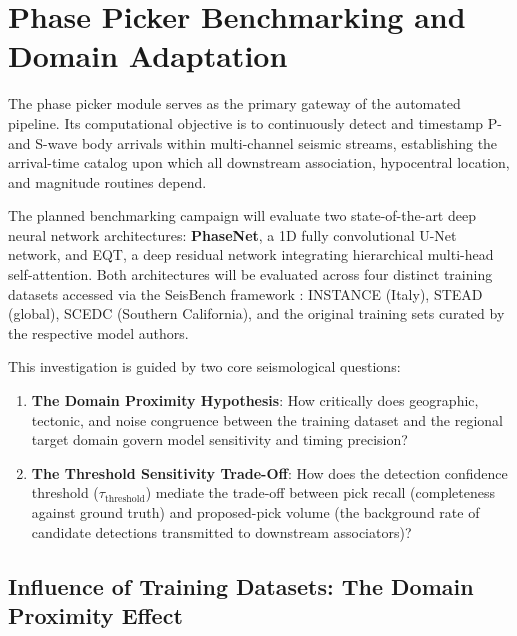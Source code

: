 \section{Phase Picker Benchmarking and Domain Adaptation}
\label{sec:picker_benchmarking}

The phase picker module serves as the primary gateway of the
automated pipeline. Its computational objective is to continuously
detect and timestamp P- and S-wave body arrivals within
multi-channel seismic streams, establishing the arrival-time catalog
upon which all downstream association, hypocentral location, and
magnitude routines depend.

The planned benchmarking campaign will evaluate two
state-of-the-art deep neural network architectures:
\textbf{\ac{PhaseNet}}, a 1D fully convolutional U-Net
network, and \acf{EQT}, a deep residual network integrating
hierarchical multi-head self-attention. Both architectures will be
evaluated across four distinct training datasets accessed via the
SeisBench framework \parencite{SeisBench}: \ac{INSTANCE} (Italy),
\ac{STEAD} (global), \ac{SCEDC} (Southern California), and the
original training sets curated by the respective model authors.

This investigation is guided by two core seismological questions:
\begin{enumerate}
  \item \textbf{The Domain Proximity Hypothesis}: How critically
    does geographic, tectonic, and noise congruence between the
    training dataset and the regional target domain govern model
    sensitivity and timing precision?
  \item \textbf{The Threshold Sensitivity Trade-Off}: How does the
    detection confidence threshold ($\tau_{\mathrm{threshold}}$)
    mediate the trade-off between pick recall (completeness against
    ground truth) and proposed-pick volume (the background rate of
    candidate detections transmitted to downstream associators)?
\end{enumerate}

\subsection{Influence of Training Datasets: The Domain Proximity Effect}
\label{subsec:training_datasets_influence}


